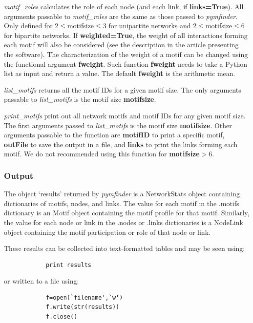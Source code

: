 \documentclass[12pt]{article}
\begin{document}
			\emph{motif\_roles} calculates the role of each node (and each link, if \textbf{links=True}). All arguments passable to \emph{motif\_roles} are the same as those passed to \emph{pymfinder}. Only defined for 2$\leq$motifsize$\leq$3 for unipartite networks and 2$\leq$motifsize$\leq$6 for bipartite networks. If \textbf{weighted=True}, the weight of all interactions forming each motif will also be considered (see the description in the article presenting the software). The characterization of the weight of a motif can be changed using the functional argument \textbf{fweight}. Such function \textbf{fweight} needs to take a Python list as input and return a value. The default \textbf{fweight} is the arithmetic mean.
			
			\emph{list\_motifs} returns all the motif IDs for a given motif size. The only arguments passable to \emph{list\_motifs} is the motif size \textbf{motifsize}.
 			
 			\emph{print\_motifs} print out all network motifs and motif IDs for any given motif size. The first arguments passed to \emph{list\_motifs} is the motif size \textbf{motifsize}. Other arguments passable to the function are \textbf{motifID} to print a specific motif, \textbf{outFile} to save the output in a file, and \textbf{links} to print the links forming each motif. We do not recommended using this function for \textbf{motifsize}$>$6.

		\subsubsection{Output}
			The object `results' returned by \emph{pymfinder} is a NetworkStats object containing dictionaries of motifs, nodes, and links. The value for each motif in the .motifs dictionary is an Motif object containing the motif profile for that motif. Similarly, the value for each node or link in the .nodes or .links dictionaries is a NodeLink object containing the motif participation or role of that node or link.

			These results can be collected into text-formatted tables and may be seen using:
			\begin{lstlisting}
			print results
			\end{lstlisting}
			
			or written to a file using:
			\begin{lstlisting}
			f=open(`filename',`w')
			f.write(str(results))
			f.close()
			\end{lstlisting}
\end{document}

